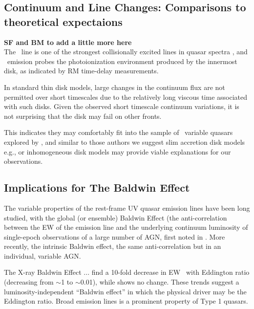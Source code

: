 \documentclass[fleqn,usenatbib]{mnras}
\begin{document}
\subsection{Continuum and Line Changes: Comparisons to theoretical expectaions}
{\bf SF and BM to add a little more here}\\
The \civ\ line is one of the strongest collisionally excited lines in quasar spectra \citep[e.g.][]{HamannFerland1999}, and \civ\ emission probes the photoionization environment produced by the innermost disk, as indicated by RM time-delay measurements. 

In standard \citet{SS73} thin disk models, large changes in the continuum flux are not permitted over short timescales due to the relatively long viscous time associated with such disks. Given the observed short timescale continuum variations, it is not surprising that the \citet{SS73} disk may fail on other fronts. %

This indicates they may comfortably fit into the sample of \civ\ variable quasars explored by \citet{Dyer2019}, and similar to those authors we suggest slim accretion disk models e.g., \citet[][]{Abramowicz1988} or inhomogeneous disk models
\citep[e.g.,][]{DexterAgol2011} may provide viable explanations for our observations.


\subsection{Implications for The Baldwin Effect}
The variable properties of the rest-frame UV quasar emission lines have been long studied, with the global (or ensemble) Baldwin Effect (the anti-correlation between the EW of the emission line and the underlying continuum luminosity of single-epoch observations of a large number of AGN, first noted in \citet{Baldwin1977}.  More recently, the intrinsic Baldwin effect, the same anti-correlation but in an individual, variable AGN.  

The X-ray Baldwin Effect \citep[e.g., ][]{Iwasawa_Taniguchi1993}... \citet{Bachev2004} find a 10-fold decrease in EW \civ\ with Eddington ratio (decreasing from $\sim$1 to $\sim$0.01), while \nv shows no change. These trends suggest a luminosity-independent ``Baldwin effect'' in which the physical driver may be the Eddington ratio. \citet{Ge2016} Broad emission lines is a prominent property of Type 1 quasars. 
\end{document}
